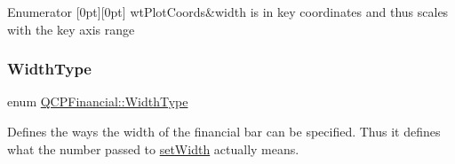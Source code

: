 \begin{DoxyEnumFields}{Enumerator}
[0pt][0pt]{}\mbox{\label{class_q_c_p_financial_aef1761dda71a53dc5269685e9e492626aebf2679f42649543a6cf372741d03ea3}} 
wt\+Plot\+Coords&width is in key coordinates and thus scales with the key axis range \\
\hline

\end{DoxyEnumFields}
\mbox{\label{class_q_c_p_financial_aef1761dda71a53dc5269685e9e492626}} 
\subsubsection{\texorpdfstring{Width\+Type}{WidthType}\hspace{0.1cm}{\footnotesize\ttfamily [2/2]}}
{\footnotesize\ttfamily enum \hyperlink{class_q_c_p_financial_aef1761dda71a53dc5269685e9e492626}{Q\+C\+P\+Financial\+::\+Width\+Type}}

Defines the ways the width of the financial bar can be specified. Thus it defines what the number passed to \hyperlink{class_q_c_p_financial_a99633f8bac86a61d534ae5eeb1a3068f}{set\+Width} actually means.

